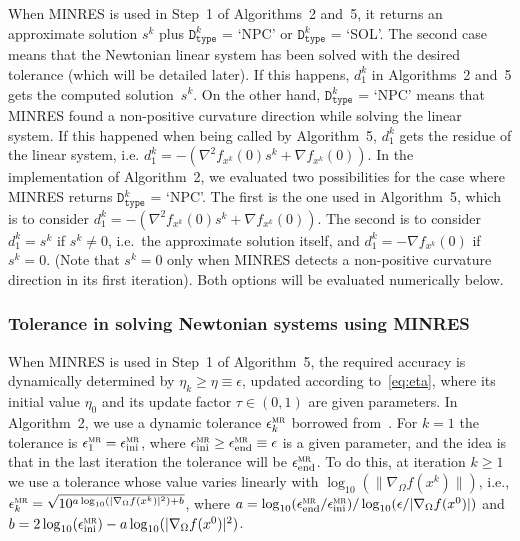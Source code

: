 \documentclass[11pt]{article}
\begin{document}
When MINRES is used in Step~1 of Algorithms~2 and~5, it returns an approximate solution $s^k$ plus $\texttt{D}_{\texttt{type}}^{k}$ = `NPC' or $\texttt{D}_{\texttt{type}}^{k}$ = `SOL'. The second case means that the Newtonian linear system has been solved with the desired tolerance (which will be detailed later). If this happens, $d_1^k$ in Algorithms~2 and~5 gets the computed solution~$s^k$. On the other hand, $\texttt{D}_{\texttt{type}}^{k}$ = `NPC' means that MINRES found a non-positive curvature direction while solving the linear system. If this happened when being called by Algorithm~5, $d_1^k$ gets the residue of the linear system, i.e. $d_1^k = -(\nabla^2 f_{x^k}(0) s^k + \nabla f_{x^k}(0))$. In the implementation of Algorithm~2, we evaluated two possibilities for the case where MINRES returns $\texttt{D}_{\texttt{type}}^{k}$ = `NPC'. The first is the one used in Algorithm~5, which is to consider $d_1^k = -(\nabla^2 f_{x^k}(0) s^k + \nabla f_{x^k}(0))$. The second is to consider $d_1^k=s^k$ if $s^k \neq 0$, i.e.\ the approximate solution itself, and $d_1^k=-\nabla f_{x^k}(0)$ if $s^k=0$. (Note that $s^k=0$ only when MINRES detects a non-positive curvature direction in its first iteration). Both options will be evaluated numerically below.

\subsubsection{Tolerance in solving Newtonian systems using MINRES} \label{sec312}

When MINRES is used in Step~1 of Algorithm~5, the required accuracy is dynamically determined by $\eta_k \geq \eta \equiv \epsilon$, updated according to~\eqref{eq:eta}, where its initial value $\eta_0$ and its update factor $\tau \in (0,1)$ are given parameters. In Algorithm~2, we use a dynamic tolerance $\epsilon^{\mathrm{\textsc{mr}}}_k$ borrowed from~\cite[p.113]{bmgencan}. For $k=1$ the tolerance is $\epsilon^{\mathrm{\textsc{mr}}}_1 = \epsilon^{\mathrm{\textsc{mr}}}_{\mathrm{ini}}$, where $\epsilon^{\mathrm{\textsc{mr}}}_{\mathrm{ini}} \geq \epsilon^{\mathrm{\textsc{mr}}}_{\mathrm{end}} \equiv \epsilon$ is a given parameter, and the idea is that in the last iteration the tolerance will be $\epsilon^{\mathrm{\textsc{mr}}}_{\mathrm{end}}$. To do this, at iteration $k \geq 1$ we use a tolerance whose value varies linearly with $\log_{10}(\|\nabla_{\Omega} f(x^k)\|)$, i.e., 
$\epsilon^{\mathrm{\textsc{mr}}}_k = \sqrt{10^{a \log_{10} ( | \nabla_\Omega f(x^k) |^2 ) + b}}$,
where
$a = \log_{10}(\epsilon^{\mathrm{\textsc{mr}}}_{\mathrm{end}} / \epsilon^{\mathrm{\textsc{mr}}}_{\mathrm{ini}}) / \log_{10}(\epsilon / | \nabla_\Omega f(x^0) | )$
and
$b = 2 \log_{10}(\epsilon^{\mathrm{\textsc{mr}}}_{\mathrm{ini}}) - a \log_{10} ( | \nabla_\Omega f(x^0) |^2 )$. 
\end{document}
